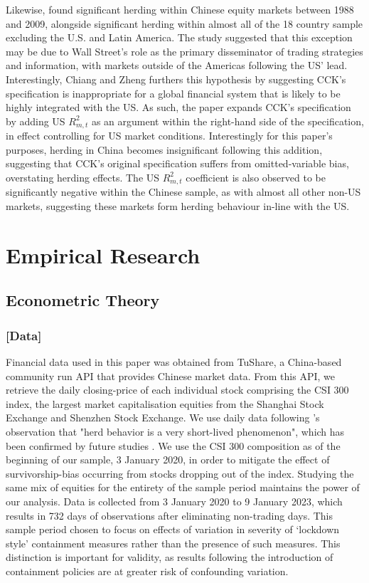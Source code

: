 \documentclass[12pt]{article}
\numberwithin{table}{section}   %
\begin{document}
Likewise, \citet{chiangzheng} found significant herding within Chinese equity markets between 1988 and 2009, alongside significant herding within almost all of the 18 country sample excluding the U.S. and Latin America. The study suggested that this exception may be due to Wall Street’s role as the primary disseminator of trading strategies and information, with markets outside of the Americas following the US’ lead. Interestingly, Chiang and Zheng furthers this hypothesis by suggesting CCK’s specification is inappropriate for a global financial system that is likely to be highly integrated with the US. As such, the paper expands CCK’s specification by adding US $R_{m,t}^2$ as an argument within the right-hand side of the specification, in effect controlling for US market conditions. Interestingly for this paper’s purposes, herding in China becomes insignificant following this addition, suggesting that CCK’s original specification suffers from omitted-variable bias, overstating herding effects. The US $R_{m,t}^2$ coefficient is also observed to be significantly negative within the Chinese sample, as with almost all other non-US markets, suggesting these markets form herding behaviour in-line with the US.

\break

\section{Empirical Research}

\subsection{Econometric Theory}

\subsubsection*{[Data]}

Financial data used in this paper was obtained from TuShare, a China-based community run API that provides Chinese market data. From this API, we retrieve the daily closing-price of each individual stock comprising the CSI 300 index, the largest market capitalisation equities from the Shanghai Stock Exchange and Shenzhen Stock Exchange. We use daily data following \citet{ch}'s observation that "herd behavior is a very short-lived phenomenon", which has been confirmed by future studies \citep{tan}. We use the CSI 300 composition as of the beginning of our sample, 3 January 2020, in order to mitigate the effect of survivorship-bias occurring from stocks dropping out of the index. Studying the same mix of equities for the entirety of the sample period maintains the power of our analysis. Data is collected from 3 January 2020 to 9 January 2023, which results in 732 days of observations after eliminating non-trading days. This sample period chosen to focus on effects of variation in severity of ‘lockdown style’ containment measures rather than the presence of such measures. This distinction is important for validity, as results following the introduction of containment policies are at greater risk of confounding variation.
\end{document}
